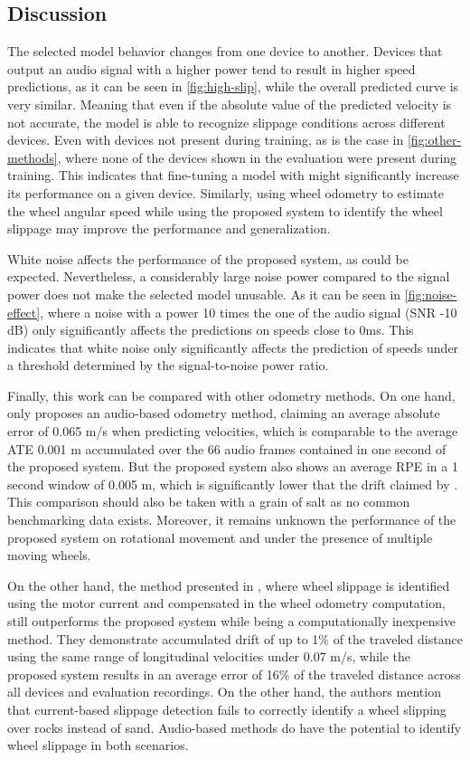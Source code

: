 \subsection{Discussion} \label{subsec:discussion}

\balance

The selected model behavior changes from one device to another. Devices that
output an audio signal with a higher power tend to result in higher speed
predictions, as it can be seen in \cref{fig:high-slip}, while the overall
predicted curve is very similar. Meaning that even if the absolute value of the
predicted velocity is not accurate, the model is able to recognize slippage
conditions across different devices. Even with devices not present during
training, as is the case in \cref{fig:other-methods}, where none of the devices
shown in the evaluation were present during training. This indicates that
fine-tuning \cite{TL2016} a model with might significantly increase its
performance on a given device. Similarly, using wheel odometry to estimate the
wheel angular speed while using the proposed system to identify the wheel
slippage may improve the performance and generalization.

White noise affects the performance of the proposed system, as could
be expected. Nevertheless, a considerably large noise power compared to the
signal power does not make the selected model unusable. As it can be seen in
\cref{fig:noise-effect}, where a noise with a power 10 times the one of the
audio signal (SNR -10 dB) only significantly affects the predictions on
speeds close to 0ms. This indicates that white noise only significantly affects
the prediction of speeds under a threshold determined by the signal-to-noise
power ratio.

Finally, this work can be compared with other odometry methods. On one hand,
only \cite{marchegiani2018a} proposes an audio-based odometry method, claiming
an average absolute error of 0.065 m/s when predicting velocities, which is
comparable to the average ATE 0.001 m accumulated over the 66 audio frames
contained in one second of the proposed system. But the proposed system also
shows an average RPE in a 1 second window of 0.005 m, which is significantly
lower that the drift claimed by \citeauthor{marchegiani2018a}. This comparison should
also be taken with a grain of salt as no common benchmarking data exists.
Moreover, it remains unknown the performance of the proposed system on
rotational movement and under the presence of multiple moving wheels.

On the other hand, the method presented in \cite{Ojeda2006}, where wheel
slippage is identified using the motor current and compensated in the wheel
odometry computation, still outperforms the proposed system while being a
computationally inexpensive method. They demonstrate accumulated drift of up to
1\% of the traveled distance using the same range of longitudinal velocities
under 0.07 m/s, while the proposed system results in an average error of
16\% of the traveled distance across all devices and evaluation recordings.
On the other hand, the authors mention that current-based slippage detection
fails to correctly identify a wheel slipping over rocks instead of sand.
Audio-based methods do have the potential to identify wheel slippage in both
scenarios.